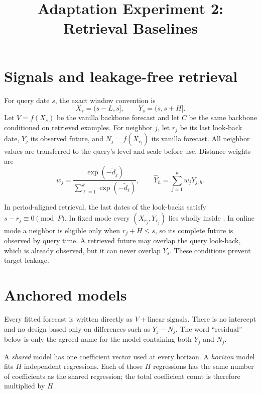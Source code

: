 \documentclass[10pt]{article}
\title{Adaptation Experiment 2: Retrieval Baselines}
\author{}
\date{}
\begin{document}
\maketitle

\section{Signals and leakage-free retrieval}
For query date $s$, the exact window convention is
\[
 X_s=(s-L,s],\qquad Y_s=(s,s+H].
\]
Let $V=f(X_s)$ be the vanilla backbone forecast and let $C$ be the same
backbone conditioned on retrieved examples. For neighbor $j$, let $r_j$ be
its last look-back date, $Y_j$ its observed future, and $N_j=f(X_{r_j})$ its
vanilla forecast. All neighbor values are transferred to the query's level
and scale before use. Distance weights are
\[
 w_j=\frac{\exp(-\widetilde d_j)}{\sum_{\ell=1}^{k}
 \exp(-\widetilde d_\ell)},\qquad
 \widehat Y_h=\sum_{j=1}^{k}w_jY_{j,h}.
\]

In period-aligned retrieval, the last dates of the look-backs satisfy
$s-r_j\equiv0\pmod P$. In fixed mode every $(X_{r_j},Y_{r_j})$ lies wholly
inside \Tzero. In online mode a neighbor is eligible only when
$r_j+H\leq s$, so its complete future is observed by query time. A retrieved
future may overlap the query look-back, which is already observed, but it can
never overlap $Y_s$. These conditions prevent target leakage.


\section{Anchored models}
Every fitted forecast is written directly as $V+\text{linear signals}$.
There is no intercept and no design based only on differences such as
$Y_j-N_j$. The word ``residual'' below is only the agreed name for the model
containing both $Y_j$ and $N_j$.

A \emph{shared} model has one coefficient vector used at every horizon.
A \emph{horizon} model fits $H$ independent regressions. Each of those $H$
regressions has the same number of coefficients as the shared regression;
the total coefficient count is therefore multiplied by $H$.
\end{document}
